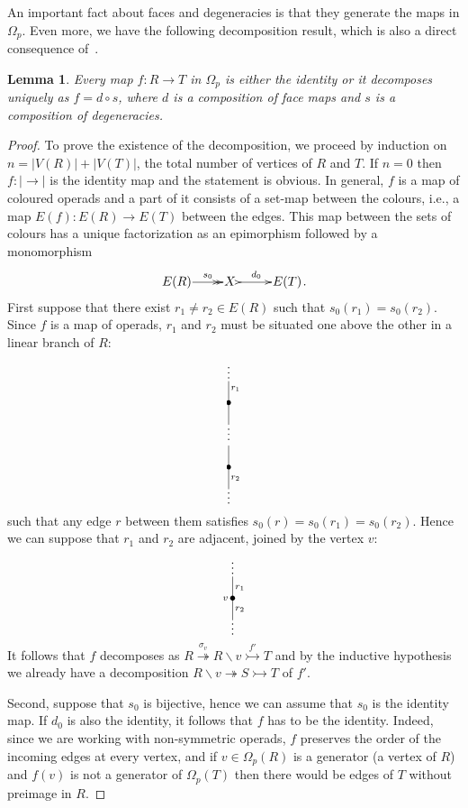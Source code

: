 \documentclass[a4paper]{amsart}
\theoremstyle{plain}
\newtheorem{lem}[thm]{Lemma}
\theoremstyle{definition}
\theoremstyle{remark}
\newcommand{\rpd}{\Omega_p}
\newcommand{\To}{\longrightarrow}
\numberwithin{equation}{section}
\numberwithin{figure}{section}
\begin{document}
An important fact about faces and degeneracies is that they generate the maps in $\rpd$. Even more, we have the following
decomposition result, which is also a direct consequence of~\cite[Theorem 2.3.27]{Wei07}.
\begin{lem}\label{unique decomposition}
Every map $f:R\To T$ in $\rpd$ is either the identity or it decomposes uniquely as $f=d\circ s$, where $d$ is a composition
of face
maps and $s$ is a composition of degeneracies.
\end{lem}
\begin{proof}
To prove the existence of the decomposition, we proceed by induction
on $n=|V(R)|+|V(T)|$, the total number of vertices of $R$ and $T$.
If $n=0$ then $f:|\To |$ is the identity map and the statement is
obvious. In general, $f$ is a map of coloured operads and a part of
it consists of a set-map between the colours, i.e., a map
$E(f)\colon E(R)\To E(T)$ between the edges. This map between the
sets of colours has a unique factorization as an epimorphism
followed by a monomorphism
$$
\xymatrix@1{E(R)\ar@{->>}[r]^-{s_0}&X\ \ar@{>->}[r]^-{d_0}&E(T)}.
$$
First suppose that there exist $r_1\neq r_2\in E(R)$ such that $s_0(r_1)=s_0(r_2)$. Since $f$ is a map of operads, $r_1$ and
$r_2$ must be situated one above the other in a linear branch of $R$:
$$
\xy<0.1cm,0cm>:
(0, 15.5)*{\vdots};
(0, -19.5)*{\vdots};
(2,10)*{\scriptstyle r_1};
(2,-15)*{\scriptstyle r_2};
(0,12)*=0{}="2";
(0,6)*=0{\bullet}="3";
(0,0)*=0{}="4";
(0,-1.7)*=0{\vdots}="5";
(0,-6)*=0{}="6";
(0,-12)*=0{\bullet}="7";
(0,-18)*=0{}="8";
"2";"3" **\dir{-};
"3";"4" **\dir{-};
"6";"7" **\dir{-};
"7";"8" **\dir{-};
\endxy
$$
such that any edge $r$ between them satisfies $s_0(r)=s_0(r_1)=s_0(r_2)$. Hence we can suppose that $r_1$ and $r_2$ are
adjacent, joined by the vertex $v$:
$$
\xy<0.1cm,0cm>:
(0, 9.5)*{\vdots};
(0, -7.5)*{\vdots};
(2,3)*{\scriptstyle r_1};
(2,-3)*{\scriptstyle r_2};
(-2,0)*{\scriptstyle v};
(0,6)*=0{}="1";
(0,0)*=0{\bullet}="2";
(0,-6)*=0{}="3";
"1";"2" **\dir{-};
"2";"3" **\dir{-};
\endxy
$$
It follows that $f$ decomposes as $R\stackrel{\sigma_v}{\twoheadrightarrow} R\backslash v\stackrel{f'}{\rightarrowtail}T$ and by the inductive
hypothesis we already have a decomposition $R\backslash v\twoheadrightarrow S\rightarrowtail T$ of $f'$.

Second, suppose that $s_0$ is bijective, hence we can assume that
$s_0$ is the identity map. If $ d_0$ is also the identity, it
follows that $f$ has to be the identity. Indeed, since we are
working with non-symmetric operads, $f$ preserves the order of the
incoming edges at every vertex, and if $v\in\Omega_p(R)$ is a
generator (a vertex of $R$) and $f(v)$ is not a generator of
$\Omega_p(T)$ then there would be edges of $T$ without preimage in
$R$.


\end{proof}
\end{document}
